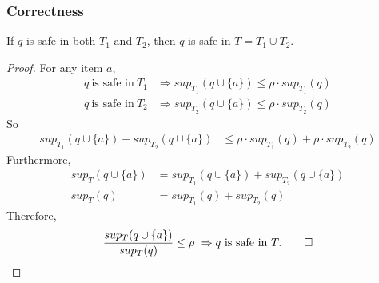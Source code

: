 \subsubsection{Correctness}
\begin{lemma}%
\label{CorrectnessOfPartitioning}
  If $q$ is safe in both $T_1$ and $T_2$, then $q$ is safe in $T = T_1 \cup T_2$.
\end{lemma}
\begin{proof}
For any item $a$,
  \begin{align*}
   q~\text{is safe in}~T_1 &\Rightarrow sup_{T_1}(q\cup\{a\}) \le \rho\cdot sup_{T_1}(q) \\
   q~\text{is safe in}~T_2 &\Rightarrow sup_{T_2}(q\cup\{a\}) \le \rho\cdot sup_{T_2}(q)
  \end{align*}
  So \begin{align*}
   sup_{T_1}(q\cup\{a\}) + sup_{T_2}(q\cup\{a\}) &\le \rho\cdot sup_{T_1}(q) + \rho\cdot sup_{T_2}(q)
  \end{align*}
  Furthermore,
  \begin{align*}
    sup_T(q\cup\{a\}) &= sup_{T_1}(q\cup\{a\}) + sup_{T_2}(q\cup\{a\}) \\
    sup_T(q) &= sup_{T_1}(q) + sup_{T_2}(q)
  \end{align*}
  Therefore, $$ \frac{sup_T(q\cup\{a\})}{sup_T(q)} \le \rho~\Rightarrow q~\text{is safe in}~T.\qed$$ 
\end{proof}


